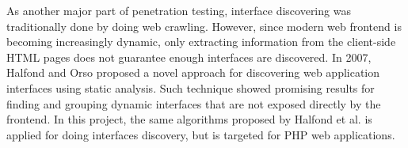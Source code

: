 As another major part of penetration testing, interface discovering was traditionally done by doing web crawling. However, since modern web frontend is becoming increasingly dynamic, only extracting information from the client-side HTML pages does not guarantee enough interfaces are discovered. In 2007, Halfond and Orso \cite{ref3} proposed a novel approach for discovering web application interfaces using static analysis. Such technique showed promising results for finding and grouping dynamic interfaces that are not exposed directly by the frontend.
In this project, the same algorithms proposed by Halfond et al. is applied for doing interfaces discovery, but is targeted for PHP web applications.




